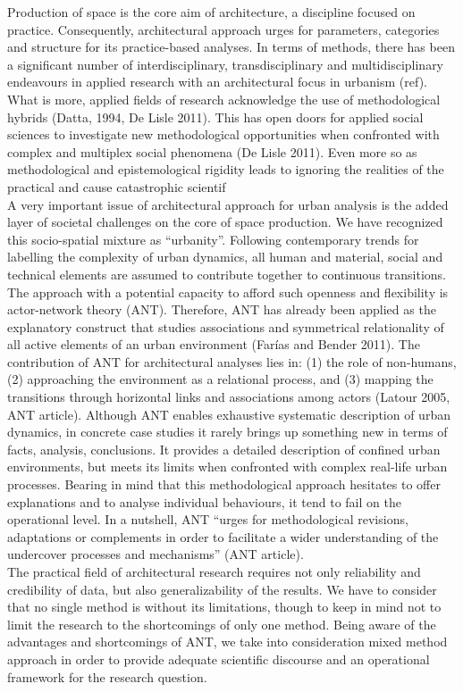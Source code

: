 \documentclass[11pt]{report}
\begin{document}
Production of space is the core aim of architecture, a discipline focused on practice. Consequently, architectural approach urges for parameters, categories and structure for its practice-based analyses. In terms of methods, there has been a significant number of interdisciplinary, transdisciplinary and multidisciplinary endeavours in applied research with an architectural focus in urbanism (ref). What is more, applied fields of research acknowledge the use of methodological hybrids (Datta, 1994, De Lisle 2011). This has open doors for applied social sciences to investigate new methodological opportunities when confronted with complex and multiplex social phenomena (De Lisle 2011). Even more so as methodological and epistemological rigidity leads to ignoring the realities of the practical and cause catastrophic scientif
\\
A very important issue of architectural approach for urban analysis is the added layer of societal challenges on the core of space production. We have recognized this socio-spatial mixture as “urbanity”. Following contemporary trends for labelling the complexity of urban dynamics, all human and material, social and technical elements are assumed to contribute together to continuous transitions. The approach with a potential capacity to afford such openness and flexibility is actor-network theory (ANT). Therefore, ANT has already been applied as the explanatory construct that studies associations and symmetrical relationality of all active elements of an urban environment (Farías and Bender 2011). The contribution of ANT for architectural analyses lies in: (1) the role of non-humans, (2) approaching the environment as a relational process, and (3) mapping the transitions through horizontal links and associations among actors (Latour 2005, ANT article). Although ANT enables exhaustive systematic description of urban dynamics, in concrete case studies it rarely brings up something new in terms of facts, analysis, conclusions. It provides a detailed description of confined urban environments, but meets its limits when confronted with complex real-life urban processes. Bearing in mind that this methodological approach hesitates to offer explanations and to analyse individual behaviours, it tend to fail on the operational level. In a nutshell, ANT “urges for methodological revisions, adaptations or complements  in order to facilitate a wider understanding of the undercover processes and mechanisms” (ANT article).
\\
The practical field of architectural research requires not only reliability and credibility of data, but also generalizability of the results. We have to consider that no single method is without its limitations, though to keep in mind not to limit the research to the shortcomings of only one method. Being aware of the advantages and shortcomings of ANT, we take into consideration mixed method approach in order to provide adequate scientific discourse and an operational framework for the research question. 
\end{document}
